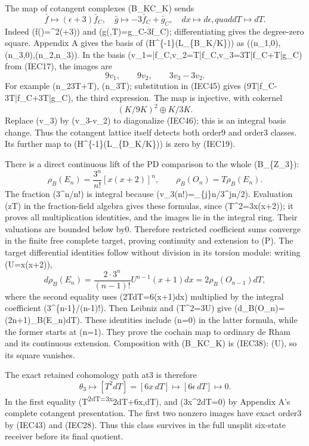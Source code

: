 \documentclass[
  10pt,
]{article}
\begin{document}
The map of cotangent complexes (B\_K\to C\_K) sends \[
\bar f\mapsto(\epsilon+3)\bar f_C,
\quad\bar g\mapsto-3\bar f_C+\bar g_C,
\quad dx\mapsto d\epsilon,quad dT\mapsto dT.
\tag{IEC45}
\] Indeed (f(\epsilon)=\epsilon\^{}2(\epsilon+3)) and
(g(\epsilon,T)=g\_C-3f\_C); differentiating gives the degree-zero
square. Appendix A gives the basis of (H\^{}\{-1\}(L\_\{B\_K/K\})) as
((n\_1,0),(n\_3,0),(n\_2,n\_3)). In the basis
(v\_1=\epsilon\bar f\_C,v\_2=\epsilon T\bar f\_C,v\_3=3T\bar f\_C+\epsilon T\bar g\_C)
from (IEC17), the images are \[
9v_1,\qquad9v_2,\qquad3v_3-3v_2.
\tag{IEC46}
\] For example (n\_2\mapsto3T+\epsilon T), (n\_3\epsilon T);
substitution in (IEC45) gives
(9T\bar f\_C-3\epsilon T\bar f\_C+3\epsilon T\bar g\_C), the third
expression. The map is injective, with cokernel \[
(K/9K)^2\oplus K/3K.
\tag{IEC47}
\] Replace (v\_3) by (v\_3-v\_2) to diagonalize (IEC46); this is an
integral basis change. Thus the cotangent lattice itself detects both
order9 and order3 classes. Its further map to
(H\^{}\{-1\}(L\_\{D\_K/K\})) is zero by (IEC19).

There is a direct continuous lift of the PD comparison to the whole
(B\_\{\mathbb Z\_3\}): \[
\rho_B(E_n)=\frac{3^n}{n!}[x(x+2)]^n,
\qquad \rho_B(O_n)=T\rho_B(E_n).
\tag{IEC48}
\] The fraction (3\^{}n/n!) is integral because
(v\_3(n!)=\sum\_\{j\}\lfloor n/3\^{}j\rfloor\le n/2). Evaluation
(z\mapsto T) in the fraction-field algebra gives these formulas, since
(T\^{}2=3x(x+2)); it proves all multiplication identities, and the
images lie in the integral ring. Their valuations are bounded below by0.
Therefore restricted coefficient sums converge in the finite free
complete target, proving continuity and extension to (\widehat P). The
target differential identities follow without division in its torsion
module: writing (U=x(x+2)), \[
d\rho_B(E_n)=\frac{2\cdot3^n}{(n-1)!}U^{n-1}(x+1)dx
=2\rho_B(O_{n-1})dT,
\tag{IEC49}
\] where the second equality uses (2TdT=6(x+1)dx) multiplied by the
integral coefficient (3\^{}\{n-1\}/(n-1)!). Then Leibniz and (T\^{}2=3U)
give (d\rho\_B(O\_n)=(2n+1)\rho\_B(E\_n)dT). These identities include
(n=0) in the latter formula, while the former starts at (n=1). They
prove the cochain map to ordinary de Rham and its continuous extension.
Composition with (B\_K\to C\_K) is (IEC38): (U\epsilon), so its
square vanishes.

The exact retained cohomology path at3 is therefore \[
\theta_3\longmapsto[T^2dT]=[6x\,dT]
\longmapsto[6\epsilon\,dT]\longmapsto0.
\tag{IEC50}
\] In the first equality (T\textsuperscript{2dT=3x}2dT+6x,dT), and
(3x\^{}2dT=0) by Appendix A's complete cotangent presentation. The first
two nonzero images have exact order3 by (IEC43) and (IEC28). Thus this
class survives in the full unsplit six-state receiver before its final
quotient.
\end{document}

